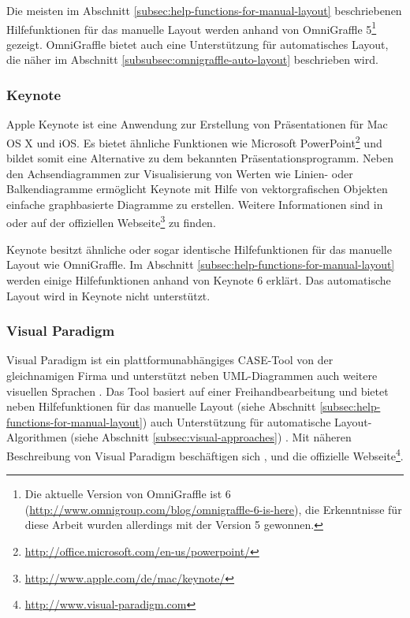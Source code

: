 Die meisten im Abschnitt \ref{subsec:help-functions-for-manual-layout} beschriebenen Hilfefunktionen für das manuelle Layout werden anhand von OmniGraffle 5\footnote{Die aktuelle Version von OmniGraffle ist 6 (\url{http://www.omnigroup.com/blog/omnigraffle-6-is-here}), die Erkenntnisse für diese Arbeit wurden allerdings mit der Version 5 gewonnen.} gezeigt. OmniGraffle bietet auch eine Unterstützung für automatisches Layout, die näher im Abschnitt \ref{subsubsec:omnigraffle-auto-layout} beschrieben wird.

\subsubsection{Keynote}
\label{subsubsec:keynote}

Apple Keynote ist eine Anwendung zur Erstellung von Präsentationen für Mac OS X und iOS. Es bietet ähnliche Funktionen wie Microsoft PowerPoint\footnote{\url{http://office.microsoft.com/en-us/powerpoint/}} und bildet somit eine Alternative zu dem bekannten Präsentationsprogramm. Neben den Achsendiagrammen zur Visualisierung von Werten wie Linien- oder Balkendiagramme ermöglicht Keynote mit Hilfe von vektorgrafischen Objekten einfache graphbasierte Diagramme zu erstellen. Weitere Informationen sind in \cite{11Keynote} oder auf der offiziellen Webseite\footnote{\url{http://www.apple.com/de/mac/keynote/}} zu finden. 

Keynote besitzt ähnliche oder sogar identische Hilfefunktionen für das manuelle Layout wie OmniGraffle. Im Abschnitt \ref{subsec:help-functions-for-manual-layout} werden einige Hilfefunktionen anhand von Keynote 6 erklärt. Das automatische Layout wird in Keynote nicht unterstützt.

\subsubsection{Visual Paradigm}
\label{subsubsec:visual-paradigm}

Visual Paradigm ist ein plattformunabhängiges CASE-Tool von der gleichnamigen Firma und unterstützt neben UML-Diagrammen auch weitere visuellen Sprachen \cite{14Visual}. Das Tool basiert auf einer Freihandbearbeitung und bietet neben Hilfefunktionen für das manuelle Layout (siehe Abschnitt \ref{subsec:help-functions-for-manual-layout}) auch Unterstützung für automatische Layout-Algorithmen (siehe Abschnitt \ref{subsec:visual-approaches}) \cite{Fuhrmann11On-the-Pragmatics}. Mit näheren Beschreibung von Visual Paradigm beschäftigen sich \cite{14Visual}, \cite[S.313-314]{Fuhrmann11On-the-Pragmatics} und die offizielle Webseite\footnote{\url{http://www.visual-paradigm.com}}.

